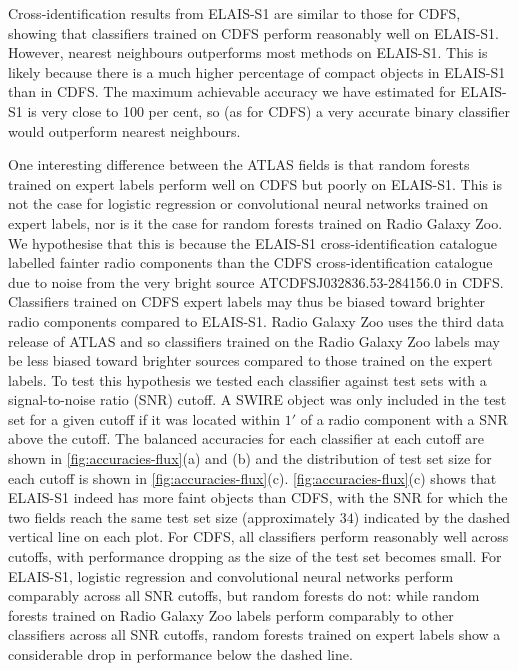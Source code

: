 \documentclass[fleqn,usenatbib,usedcolumn]{mnras}
\begin{document}
  Cross-identification results from ELAIS-S1 are similar to those for CDFS,
  showing that classifiers trained on CDFS perform reasonably well on
  ELAIS-S1. However, nearest neighbours outperforms most methods on ELAIS-S1.
  This is likely because there is a much higher percentage of compact objects in ELAIS-S1 than in CDFS. The maximum achievable accuracy we have estimated for ELAIS-S1 is very close to 100 per cent, so (as for CDFS) a very accurate binary classifier would outperform nearest neighbours.

  One interesting difference between the ATLAS fields is that random forests trained on expert labels perform well on CDFS but poorly on ELAIS-S1. This is not the case for logistic regression or convolutional neural networks trained on expert labels, nor is it the case for random forests trained on Radio Galaxy Zoo. We hypothesise that this is because the ELAIS-S1 cross-identification catalogue \citep{middelberg08} labelled fainter radio components than the CDFS cross-identification catalogue \citep{norris06} due to noise from the very bright source ATCDFS\textunderscore{}J032836.53-284156.0 in CDFS. Classifiers trained on CDFS expert labels may thus be biased toward brighter radio components compared to ELAIS-S1. Radio Galaxy Zoo uses the third data release of ATLAS \citep{franzen15} and so classifiers trained on the Radio Galaxy Zoo labels may be less biased toward brighter sources compared to those trained on the expert labels. To test this hypothesis we tested each classifier against test sets with a signal-to-noise ratio (SNR) cutoff. A SWIRE object was only included in the test set for a given cutoff if it was located within $1'$ of a radio component with a SNR above the cutoff. The balanced accuracies for each classifier at each cutoff are shown in \autoref{fig:accuracies-flux}(a) and (b) and the distribution of test set size for each cutoff is shown in \autoref{fig:accuracies-flux}(c). \autoref{fig:accuracies-flux}(c) shows that ELAIS-S1 indeed has more faint objects than CDFS, with the SNR for which the two fields reach the same test set size (approximately $34$) indicated by the dashed vertical line on each plot. For CDFS, all classifiers perform reasonably well across cutoffs, with performance dropping as the size of the test set becomes small. For ELAIS-S1, logistic regression and convolutional neural networks perform comparably across all SNR cutoffs, but random forests do not: while random forests trained on Radio Galaxy Zoo labels perform comparably to other classifiers across all SNR cutoffs, random forests trained on expert labels show a considerable drop in performance below the dashed line.
\end{document}
